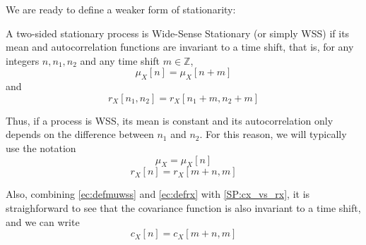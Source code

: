 We are ready to define a weaker form of stationarity:

\begin{definition}
A two-sided stationary process is Wide-Sense Stationary (or simply WSS) if its mean and autocorrelation functions are invariant to a time shift, that is, for any integers $n, n_1, n_2$ and any time shift $m \in \mathbb{Z}$,
\begin{equation}
\mu_X[n] = \mu_X[n+m]
\end{equation}
and
\begin{equation}
r_X[n_1,n_2] = r_X[n_1 + m, n_2 + m]
\end{equation}
\end{definition}

Thus, if a process is WSS, its mean is constant and its autocorrelation only depends on the difference between $n_1$ and $n_2$. For this reason, we will typically use the notation
\begin{equation}\label{ec:defmuwss}
\mu_X = \mu_X[n]
\end{equation}
\begin{equation}\label{ec:defrx}
r_X[n] = r_X[m + n, m]
\end{equation}

Also, combining \eqref{ec:defmuwss} and \eqref{ec:defrx} with \eqref{SP:cx_vs_rx}, it is straighforward to see that the covariance function is also invariant to a time shift, and we can write
\begin{equation}\label{ec:defcx}
c_X[n] = c_X[m + n, m]
\end{equation}


